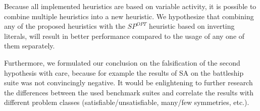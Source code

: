 
Because all implemented heuristics are based on variable activity, it is possible to combine
multiple heuristics into a new heuristic.
We hypothesize that combining any of the proposed heuristics with the $SP^{OPT}$ heuristic based on
inverting literals, will result in better performance compared to the usage of any one of them
separately.

Furthermore, we formulated our conclusion on the falsification of the second hypothesis with care,
because for example the results of SA on the battleship suite was not convincingly negative.
It would be enlightening to further research the differences between the used benchmark suites and
correlate the results with different problem classes (satisfiable/unsatisfiable, many/few
symmetries, etc.).
